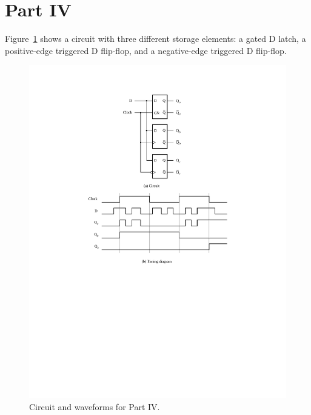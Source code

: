\documentclass[epsfig,10pt,fullpage]{article}
\begin{document}
\newpage
\section*{Part IV}
Figure~\ref{fig:waves} shows a circuit with three different storage elements: a gated D latch, 
a positive-edge triggered D flip-flop, and a negative-edge triggered D flip-flop.

\begin{figure}[H]
	\begin{center}
		\includegraphics[]{figures/figure6.pdf}
	\end{center}
	\caption{Circuit and waveforms for Part IV.}
\label{fig:waves}
\end{figure}
\end{document}
